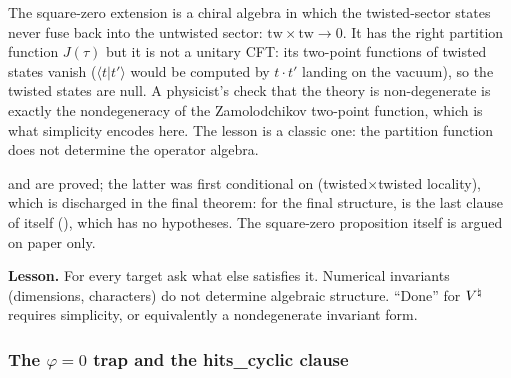 \begin{physics}
The square-zero extension is a chiral algebra in which the twisted-sector states never fuse
back into the untwisted sector: $\mathrm{tw}\times\mathrm{tw}\to 0$. It has the right partition
function $J(\tau)$ but it is not a unitary CFT: its two-point functions of twisted states vanish
($\langle t|t'\rangle$ would be computed by $t\cdot t'$ landing on the vacuum), so the twisted states
are null. A physicist's check that the theory is non-degenerate is exactly the nondegeneracy of the
Zamolodchikov two-point function, which is what simplicity encodes here. The lesson is a classic
one: the partition function does not determine the operator algebra.
\end{physics}

\begin{status}
 and  are proved; the latter was first
conditional on  (twisted$\times$twisted locality), which is discharged in the final
theorem: for the final structure,  is the last clause of 
itself (), which has no hypotheses. The square-zero proposition itself is argued on paper only.
\end{status}

\begin{warning}
\textbf{Lesson.} For every target ask what else satisfies it. Numerical invariants (dimensions,
characters) do not determine algebraic structure. ``Done'' for ${V^{\natural}}$ requires simplicity, or
equivalently a nondegenerate invariant form.
\end{warning}

\subsubsection{The $\varphi=0$ trap and the hits\_cyclic clause}\label{ch15:sec:phi0}

